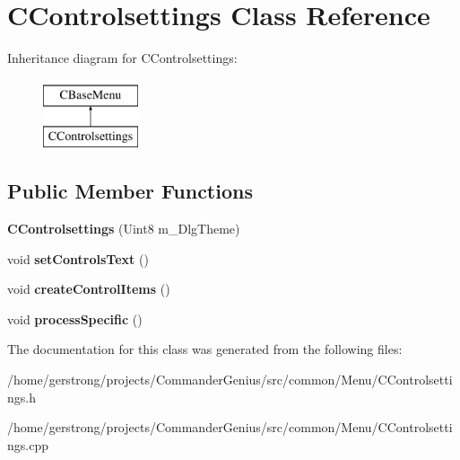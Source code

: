 \hypertarget{class_c_controlsettings}{
\section{CControlsettings Class Reference}
\label{class_c_controlsettings}
}
Inheritance diagram for CControlsettings:\begin{figure}[H]
\begin{center}
\leavevmode
\includegraphics[height=2cm]{class_c_controlsettings}
\end{center}
\end{figure}
\subsection*{Public Member Functions}
\begin{DoxyCompactItemize}
\item 
\hypertarget{class_c_controlsettings_a851b35e91b1494338e2157694d31dc0f}{
{\bfseries CControlsettings} (Uint8 m\_\-DlgTheme)}
\label{class_c_controlsettings_a851b35e91b1494338e2157694d31dc0f}

\item 
\hypertarget{class_c_controlsettings_ab89777996e63bfad1bd335d0fe46606e}{
void {\bfseries setControlsText} ()}
\label{class_c_controlsettings_ab89777996e63bfad1bd335d0fe46606e}

\item 
\hypertarget{class_c_controlsettings_aec3c006c0767c3538665f4658aa675eb}{
void {\bfseries createControlItems} ()}
\label{class_c_controlsettings_aec3c006c0767c3538665f4658aa675eb}

\item 
\hypertarget{class_c_controlsettings_aad7985258e58d53ccad68bc632625a2b}{
void {\bfseries processSpecific} ()}
\label{class_c_controlsettings_aad7985258e58d53ccad68bc632625a2b}

\end{DoxyCompactItemize}


The documentation for this class was generated from the following files:\begin{DoxyCompactItemize}
\item 
/home/gerstrong/projects/CommanderGenius/src/common/Menu/CControlsettings.h\item 
/home/gerstrong/projects/CommanderGenius/src/common/Menu/CControlsettings.cpp\end{DoxyCompactItemize}

